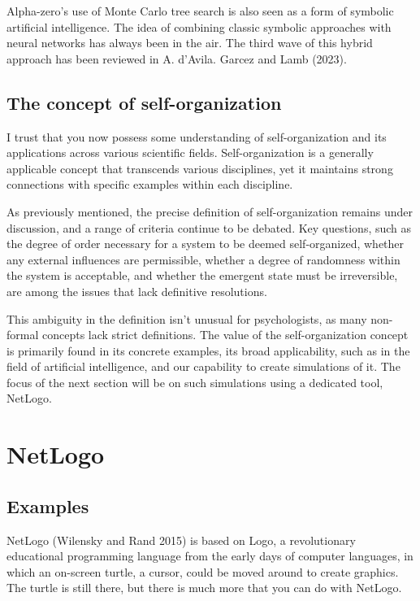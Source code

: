 \documentclass[
  a4paper,
  DIV=11,
  numbers=noendperiod]{scrreprt}
\begin{document}
Alpha-zero's use of Monte Carlo tree search is also seen as a form of
symbolic artificial intelligence. The idea of combining classic symbolic
approaches with neural networks has always been in the air. The third
wave of this hybrid approach has been reviewed in A. d'Avila. Garcez and
Lamb (2023).

\hypertarget{sec-The-concept-of-selforganization}{%
\subsection{The concept of
self-organization}\label{sec-The-concept-of-selforganization}}

I trust that you now possess some understanding of self-organization and
its applications across various scientific fields. Self-organization is
a generally applicable concept that transcends various disciplines, yet
it maintains strong connections with specific examples within each
discipline.

As previously mentioned, the precise definition of self-organization
remains under discussion, and a range of criteria continue to be
debated. Key questions, such as the degree of order necessary for a
system to be deemed self-organized, whether any external influences are
permissible, whether a degree of randomness within the system is
acceptable, and whether the emergent state must be irreversible, are
among the issues that lack definitive resolutions.

This ambiguity in the definition isn't unusual for psychologists, as
many non-formal concepts lack strict definitions. The value of the
self-organization concept is primarily found in its concrete examples,
its broad applicability, such as in the field of artificial
intelligence, and our capability to create simulations of it. The focus
of the next section will be on such simulations using a dedicated tool,
NetLogo.

\hypertarget{sec-NetLogo}{%
\section{NetLogo}\label{sec-NetLogo}}

\hypertarget{sec-Examples}{%
\subsection{Examples}\label{sec-Examples}}

NetLogo (Wilensky and Rand 2015) is based on Logo, a revolutionary
educational programming language from the early days of computer
languages, in which an on-screen turtle, a cursor, could be moved around
to create graphics. The turtle is still there, but there is much more
that you can do with NetLogo.
\end{document}
